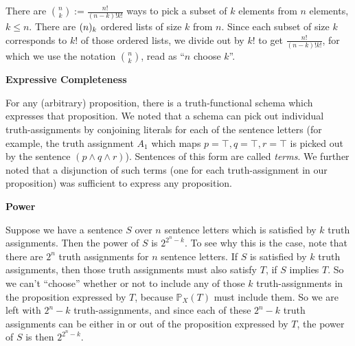 \begin{mdframed}[linewidth=1]
There are $\binom{n}{k} := \frac{n!}{(n-k)!k!}$ ways to pick a subset of $k$ elements from $n$ elements, $k \leq n$. There are $\mbox{$(n)_{k}$}$ ordered lists of size $k$ from $n$. Since each subset of size $k$ corresponds to $k!$  of those ordered lists, we divide out by $k!$ to get $\frac{n!}{(n-k)!k!}$, for which we use the notation $\binom{n}{k}$, read as ``$n$ choose $k$''. 

\textbf{Expressive Completeness}

For any (arbitrary) proposition, there is a truth-functional schema which expresses that proposition. We noted that a schema can pick out individual truth-assignments by conjoining literals for each of the sentence letters (for example, the truth assignment $A_1$ which maps $p = \top, q = \top, r = \top$ is picked out by the sentence $(p \land q \land r)$). Sentences of this form are called \emph{terms}. We further noted that a disjunction of such terms (one for each truth-assignment in our proposition) was sufficient to express any proposition. 

\textbf{Power}

Suppose we have a sentence $S$ over $n$ sentence letters which is satisfied by $k$ truth assignments. Then the power of $S$ is $2^{2^n - k}$. To see why this is the case, note that there are $2^n$ truth assignments for $n$ sentence letters. If $S$ is satisfied by $k$ truth assignments, then those truth assignments must also satisfy $T$,  if $S$ implies $T$. So we can't ``choose'' whether or not to include any of those $k$ truth-assignments in the proposition expressed by $T$, because $\mathbb{P}_X(T)$ must include them. So we are left with $2^n - k$ truth-assignments, and since each of these $2^n - k$ truth assignments can be either in or out of the proposition expressed by $T$, the power of $S$ is then $2^{2^n - k}$.
\end{mdframed}

